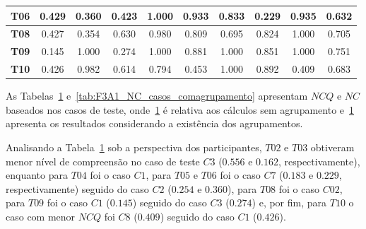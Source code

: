 \begin{table}[htbp]
\begin{tabular}{|c|ccccccccc|}
		\textbf{T06} & \multicolumn{1}{c|}{0.429} & \multicolumn{1}{c|}{0.360} & \multicolumn{1}{c|}{0.423} & \multicolumn{1}{c|}{1.000} & \multicolumn{1}{c|}{0.933} & \multicolumn{1}{c|}{0.833} & \multicolumn{1}{c|}{0.229} & \multicolumn{1}{c|}{0.935} & 0.632 \\ \hline
		\rowcolor[HTML]{F2F2F2} 
		\textbf{T08} & \multicolumn{1}{c|}{\cellcolor[HTML]{F2F2F2}0.427} & \multicolumn{1}{c|}{\cellcolor[HTML]{F2F2F2}0.354} & \multicolumn{1}{c|}{\cellcolor[HTML]{F2F2F2}0.630} & \multicolumn{1}{c|}{\cellcolor[HTML]{F2F2F2}0.980} & \multicolumn{1}{c|}{\cellcolor[HTML]{F2F2F2}0.809} & \multicolumn{1}{c|}{\cellcolor[HTML]{F2F2F2}0.695} & \multicolumn{1}{c|}{\cellcolor[HTML]{F2F2F2}0.824} & \multicolumn{1}{c|}{\cellcolor[HTML]{F2F2F2}1.000} & 0.705 \\ \hline
		\textbf{T09} & \multicolumn{1}{c|}{0.145} & \multicolumn{1}{c|}{1.000} & \multicolumn{1}{c|}{0.274} & \multicolumn{1}{c|}{1.000} & \multicolumn{1}{c|}{0.881} & \multicolumn{1}{c|}{1.000} & \multicolumn{1}{c|}{0.851} & \multicolumn{1}{c|}{1.000} & 0.751 \\ \hline
		\rowcolor[HTML]{F2F2F2} 
		\textbf{T10} & \multicolumn{1}{c|}{\cellcolor[HTML]{F2F2F2}0.426} & \multicolumn{1}{c|}{\cellcolor[HTML]{F2F2F2}0.982} & \multicolumn{1}{c|}{\cellcolor[HTML]{F2F2F2}0.614} & \multicolumn{1}{c|}{\cellcolor[HTML]{F2F2F2}0.794} & \multicolumn{1}{c|}{\cellcolor[HTML]{F2F2F2}0.453} & \multicolumn{1}{c|}{\cellcolor[HTML]{F2F2F2}1.000} & \multicolumn{1}{c|}{\cellcolor[HTML]{F2F2F2}0.892} & \multicolumn{1}{c|}{\cellcolor[HTML]{F2F2F2}0.409} & 0.683 \\ \hline
	\end{tabular}
	\label{tab:F3A1_NC_casos_semagrupamento}
\end{table}

As Tabelas~\ref{tab:F3A1_NC_casos_semagrupamento} e~\ref{tab:F3A1_NC_casos_comagrupamento} apresentam $NCQ$ e $NC$ baseados nos casos de teste, onde~\ref{tab:F3A1_NC_casos_semagrupamento} é relativa aos cálculos sem agrupamento e~\ref{tab:F3A1_NC_casos_semagrupamento} apresenta os resultados considerando a existência dos agrupamentos.

Analisando a Tabela~\ref{tab:F3A1_NC_casos_semagrupamento} sob a perspectiva dos participantes, $T02$ e $T03$ obtiveram menor nível de compreensão no caso de teste $C3$ ($0.556$ e $0.162$, respectivamente), enquanto para $T04$ foi o caso $C1$, para $T05$ e $T06$ foi o caso $C7$ ($0.183$ e $0.229$, respectivamente) seguido do caso $C2$ ($0.254$ e $0.360$), para $T08$ foi o caso $C02$, para $T09$ foi o caso $C1$ ($0.145$) seguido do caso $C3$ ($0.274$) e, por fim, para $T10$ o caso com menor $NCQ$ foi $C8$ ($0.409$) seguido do caso $C1$ ($0.426$).


